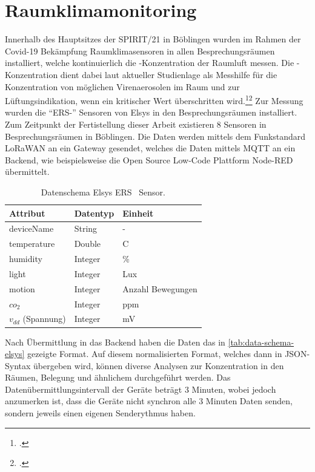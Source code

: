 \section{Raumklimamonitoring}
Innerhalb des Hauptsitzes der SPIRIT/21 in Böblingen wurden im Rahmen der Covid-19 Bekämpfung Raumklimasensoren in allen Besprechungsräumen installiert, welche kontinuierlich die \coo{}-Konzentration der Raumluft messen. Die \coo{}-Konzentration dient dabei laut aktueller Studienlage als Messhilfe für die Konzentration von möglichen Virenaerosolen im Raum und zur Lüftungsindikation, wenn ein kritischer Wert überschritten wird.\footcite[Vgl.][]{Hartmann.2020}\nzitat\footcite[Vgl.][]{Peng.2020} Zur Messung wurden die \enquote{ERS-\coo{}} Sensoren von Elsys in den Besprechungsräumen installiert. Zum Zeitpunkt der Fertistellung dieser Arbeit existieren 8 Sensoren in Besprechungsräumen in Böblingen. Die Daten werden mittels dem Funkstandard \ac{LoRaWAN} an ein Gateway gesendet, welches die Daten mittels \ac{MQTT} an ein Backend, wie beispielsweise die Open Source Low-Code Plattform Node-RED übermittelt. 

\begin{table}[H]
\centering
\begin{tabular}{|l|l|l|}
\hline
Attribut    & Datentyp & Einheit           \\ \hline
deviceName  & String   & -                 \\ \hline
temperature & Double   & \textdegree{}C     \\ \hline
humidity    & Integer  & \%                \\ \hline
light       & Integer  & Lux               \\ \hline
motion      & Integer  & Anzahl Bewegungen \\ \hline
$co_2$        & Integer  & ppm               \\ \hline
$v_{dd}$ (Spannung)         & Integer  & mV                \\ \hline
\end{tabular}
\caption[Datenschema Elsys ERS \coo{}~Sensor]{Datenschema Elsys ERS \coo{}~Sensor.\footnotemark}
\label{tab:data-schema-elsys}
\end{table}
Nach Übermittlung in das Backend haben die Daten das in \autoref{tab:data-schema-elsys} gezeigte Format. Auf diesem normalisierten Format, welches dann in \ac{JSON}-Syntax übergeben wird, können diverse Analysen zur \coo{} Konzentration in den Räumen, Belegung und ähnlichem durchgeführt werden. Das Datenübermittlungsintervall der Geräte beträgt 3 Minuten, wobei jedoch anzumerken ist, dass die Geräte nicht synchron alle 3 Minuten Daten senden, sondern jeweils einen eigenen Senderythmus haben.

